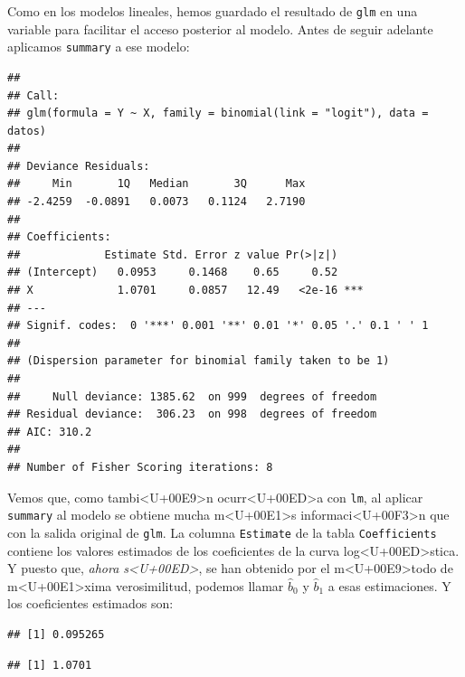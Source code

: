 \documentclass[10pt,a4paper]{article}
\newcounter {cont01}
\begin{document}
Como en los modelos lineales, hemos guardado el resultado de {\tt glm} en una variable para facilitar el acceso posterior al modelo. Antes de seguir adelante aplicamos {\tt summary} a ese modelo:
\begin{knitrout}
\color{fgcolor}\begin{kframe}
\begin{alltt}
 \hlkwb{=} 
\end{alltt}
\begin{verbatim}
## 
## Call:
## glm(formula = Y ~ X, family = binomial(link = "logit"), data = datos)
## 
## Deviance Residuals: 
##     Min       1Q   Median       3Q      Max  
## -2.4259  -0.0891   0.0073   0.1124   2.7190  
## 
## Coefficients:
##             Estimate Std. Error z value Pr(>|z|)    
## (Intercept)   0.0953     0.1468    0.65     0.52    
## X             1.0701     0.0857   12.49   <2e-16 ***
## ---
## Signif. codes:  0 '***' 0.001 '**' 0.01 '*' 0.05 '.' 0.1 ' ' 1
## 
## (Dispersion parameter for binomial family taken to be 1)
## 
##     Null deviance: 1385.62  on 999  degrees of freedom
## Residual deviance:  306.23  on 998  degrees of freedom
## AIC: 310.2
## 
## Number of Fisher Scoring iterations: 8
\end{verbatim}
\end{kframe}
\end{knitrout}
Vemos que, como tambi<U+00E9>n ocurr<U+00ED>a con {\tt lm}, al aplicar {\tt summary} al modelo se obtiene mucha m<U+00E1>s informaci<U+00F3>n que con la salida original de {\tt glm}.  La columna {\tt Estimate} de la tabla {\tt Coefficients} contiene los valores estimados de los coeficientes de la curva log<U+00ED>stica. Y puesto que, {\em ahora s<U+00ED>}, se han obtenido por el m<U+00E9>todo de m<U+00E1>xima verosimilitud, podemos llamar $\hat b_0$ y $\hat b_1$ a esas estimaciones.  Y los coeficientes estimados son:

\begin{knitrout}
\color{fgcolor}\begin{kframe}
\begin{alltt}
 \hlkwb{=} \hlopt{$}\hlstd{coefficients[}\hlstd{])}
\end{alltt}
\begin{verbatim}
## [1] 0.095265
\end{verbatim}
\begin{alltt}
 \hlkwb{=} \hlopt{$}\hlstd{coefficients[}\hlstd{])}
\end{alltt}
\begin{verbatim}
## [1] 1.0701
\end{verbatim}
\end{kframe}
\end{knitrout}
\end{document}
